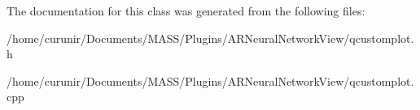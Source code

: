 The documentation for this class was generated from the following files\+:\begin{DoxyCompactItemize}
\item 
/home/curunir/\+Documents/\+M\+A\+S\+S/\+Plugins/\+A\+R\+Neural\+Network\+View/qcustomplot.\+h\item 
/home/curunir/\+Documents/\+M\+A\+S\+S/\+Plugins/\+A\+R\+Neural\+Network\+View/qcustomplot.\+cpp\end{DoxyCompactItemize}
